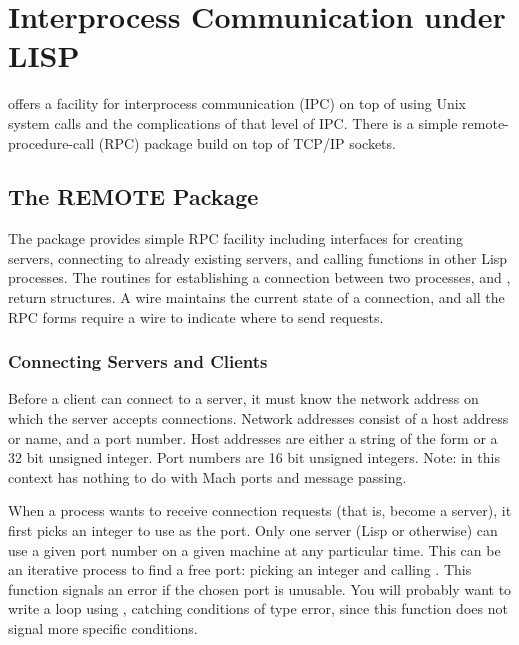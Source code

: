 \chapter{Interprocess Communication under LISP}
\label{remote}



\cmucl{} offers a facility for interprocess communication (IPC)
on top of using Unix system calls and the complications of that level
of IPC.  There is a simple remote-procedure-call (RPC) package build
on top of TCP/IP sockets.


\section{The REMOTE Package}

The  package provides simple RPC facility including
interfaces for creating servers, connecting to already existing
servers, and calling functions in other Lisp processes.  The routines
for establishing a connection between two processes,
 and ,
return  structures.  A wire maintains the current state of
a connection, and all the RPC forms require a wire to indicate where
to send requests.


\subsection{Connecting Servers and Clients}

Before a client can connect to a server, it must know the network address on
which the server accepts connections.  Network addresses consist of a host
address or name, and a port number.  Host addresses are either a string of the
form  or a 32 bit unsigned integer.  Port
numbers are 16 bit unsigned integers.  Note:  in this context has
nothing to do with Mach ports and message passing.

When a process wants to receive connection requests (that is, become a
server), it first picks an integer to use as the port.  Only one server
(Lisp or otherwise) can use a given port number on a given machine at
any particular time.  This can be an iterative process to find a free
port: picking an integer and calling .  This
function signals an error if the chosen port is unusable.  You will
probably want to write a loop using , catching
conditions of type error, since this function does not signal more
specific conditions.

